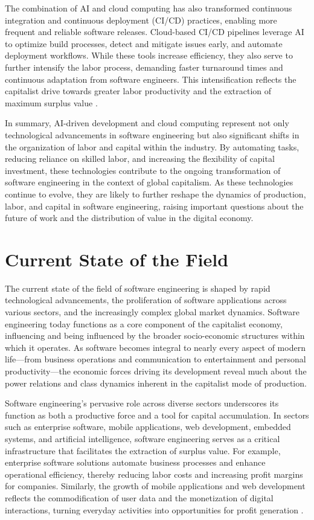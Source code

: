 \begin{refsection}
The combination of AI and cloud computing has also transformed continuous integration and continuous deployment (CI/CD) practices, enabling more frequent and reliable software releases. Cloud-based CI/CD pipelines leverage AI to optimize build processes, detect and mitigate issues early, and automate deployment workflows. While these tools increase efficiency, they also serve to further intensify the labor process, demanding faster turnaround times and continuous adaptation from software engineers. This intensification reflects the capitalist drive towards greater labor productivity and the extraction of maximum surplus value \cite[pp.~45-48]{kim2021handbook}.

In summary, AI-driven development and cloud computing represent not only technological advancements in software engineering but also significant shifts in the organization of labor and capital within the industry. By automating tasks, reducing reliance on skilled labor, and increasing the flexibility of capital investment, these technologies contribute to the ongoing transformation of software engineering in the context of global capitalism. As these technologies continue to evolve, they are likely to further reshape the dynamics of production, labor, and capital in software engineering, raising important questions about the future of work and the distribution of value in the digital economy.

\section{Current State of the Field}

The current state of the field of software engineering is shaped by rapid technological advancements, the proliferation of software applications across various sectors, and the increasingly complex global market dynamics. Software engineering today functions as a core component of the capitalist economy, influencing and being influenced by the broader socio-economic structures within which it operates. As software becomes integral to nearly every aspect of modern life—from business operations and communication to entertainment and personal productivity—the economic forces driving its development reveal much about the power relations and class dynamics inherent in the capitalist mode of production.

Software engineering's pervasive role across diverse sectors underscores its function as both a productive force and a tool for capital accumulation. In sectors such as enterprise software, mobile applications, web development, embedded systems, and artificial intelligence, software engineering serves as a critical infrastructure that facilitates the extraction of surplus value. For example, enterprise software solutions automate business processes and enhance operational efficiency, thereby reducing labor costs and increasing profit margins for companies. Similarly, the growth of mobile applications and web development reflects the commodification of user data and the monetization of digital interactions, turning everyday activities into opportunities for profit generation \cite[pp.~59-61]{harvey2007brief}.


\end{refsection}
